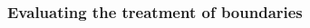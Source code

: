 \begin{multicols}{2}


\subsubsection{Evaluating the treatment of boundaries}
\label{sec:treatment_of_boundaries}


\end{multicols}
